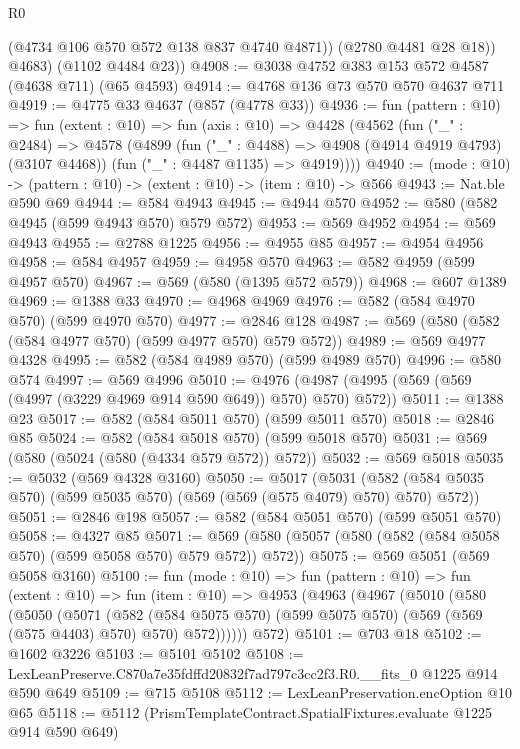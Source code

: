 \begin{lexlean}{R0}
\begin{coremodule}
            (@4734 @106 @570 @572 @138 @837 @4740 @4871))
          (@2780 @4481 @28 @18))
        @4683)
      (@1102 @4484 @23))
@4908 := @3038 @4752 @383 @153 @572 @4587 (@4638 @711) (@65 @4593)
@4914 := @4768 @136 @73 @570 @570 @4637 @711
@4919 := @4775 @33 @4637 (@857 (@4778 @33))
@4936 := fun (pattern : @10) =>
  fun (extent : @10) =>
  fun (axis : @10) =>
  @4428
    (@4562
      (fun ("_" : @2484) =>
      @4578
        (@4899
          (fun ("_" : @4488) => @4908 (@4914 @4919 @4793) (@3107 @4468))
          (fun ("_" : @4487 @1135) => @4919))))
@4940 := (mode : @10) -> (pattern : @10) -> (extent : @10) -> (item : @10) -> @566
@4943 := Nat.ble @590 @69
@4944 := @584 @4943
@4945 := @4944 @570
@4952 := @580 (@582 @4945 (@599 @4943 @570) @579 @572)
@4953 := @569 @4952
@4954 := @569 @4943
@4955 := @2788 @1225
@4956 := @4955 @85
@4957 := @4954 @4956
@4958 := @584 @4957
@4959 := @4958 @570
@4963 := @582 @4959 (@599 @4957 @570)
@4967 := @569 (@580 (@1395 @572 @579))
@4968 := @607 @1389
@4969 := @1388 @33
@4970 := @4968 @4969
@4976 := @582 (@584 @4970 @570) (@599 @4970 @570)
@4977 := @2846 @128
@4987 := @569 (@580 (@582 (@584 @4977 @570) (@599 @4977 @570) @579 @572))
@4989 := @569 @4977 @4328
@4995 := @582 (@584 @4989 @570) (@599 @4989 @570)
@4996 := @580 @574
@4997 := @569 @4996
@5010 := @4976 (@4987 (@4995 (@569 (@569 (@4997 (@3229 @4969 @914 @590 @649)) @570) @570) @572))
@5011 := @1388 @23
@5017 := @582 (@584 @5011 @570) (@599 @5011 @570)
@5018 := @2846 @85
@5024 := @582 (@584 @5018 @570) (@599 @5018 @570)
@5031 := @569 (@580 (@5024 (@580 (@4334 @579 @572)) @572))
@5032 := @569 @5018
@5035 := @5032 (@569 @4328 @3160)
@5050 := @5017
    (@5031 (@582 (@584 @5035 @570) (@599 @5035 @570) (@569 (@569 (@575 @4079) @570) @570) @572))
@5051 := @2846 @198
@5057 := @582 (@584 @5051 @570) (@599 @5051 @570)
@5058 := @4327 @85
@5071 := @569 (@580 (@5057 (@580 (@582 (@584 @5058 @570) (@599 @5058 @570) @579 @572)) @572))
@5075 := @569 @5051 (@569 @5058 @3160)
@5100 := fun (mode : @10) =>
  fun (pattern : @10) =>
  fun (extent : @10) =>
  fun (item : @10) =>
  @4953
    (@4963
      (@4967
        (@5010
          (@580
            (@5050
              (@5071
                (@582
                  (@584 @5075 @570)
                  (@599 @5075 @570)
                  (@569 (@569 (@575 @4403) @570) @570)
                  @572))))))
      @572)
@5101 := @703 @18
@5102 := @1602 @3226
@5103 := @5101 @5102
@5108 := LexLeanPreserve.C870a7e35fdffd20832f7ad797c3cc2f3.R0.__fits_0 @1225 @914 @590 @649
@5109 := @715 @5108
@5112 := LexLeanPreservation.encOption @10 @65
@5118 := @5112 (PrismTemplateContract.SpatialFixtures.evaluate @1225 @914 @590 @649)

\end{coremodule}
\end{lexlean}
